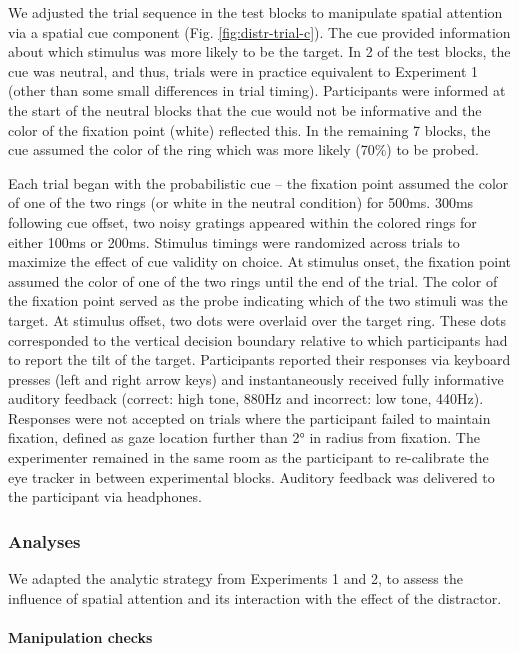 \documentclass[a4paper, nobind]{templates/ociamthesis}
\begin{document}
We adjusted the trial sequence in the test blocks to manipulate spatial attention via a spatial cue component (Fig. \ref{fig:distr-trial-c}). The cue provided information about which stimulus was more likely to be the target. In 2 of the test blocks, the cue was neutral, and thus, trials were in practice equivalent to Experiment 1 (other than some small differences in trial timing). Participants were informed at the start of the neutral blocks that the cue would not be informative and the color of the fixation point (white) reflected this. In the remaining 7 blocks, the cue assumed the color of the ring which was more likely (70\%) to be probed.

Each trial began with the probabilistic cue -- the fixation point assumed the color of one of the two rings (or white in the neutral condition) for 500ms. 300ms following cue offset, two noisy gratings appeared within the colored rings for either 100ms or 200ms. Stimulus timings were randomized across trials to maximize the effect of cue validity on choice. At stimulus onset, the fixation point assumed the color of one of the two rings until the end of the trial. The color of the fixation point served as the probe indicating which of the two stimuli was the target. At stimulus offset, two dots were overlaid over the target ring. These dots corresponded to the vertical decision boundary relative to which participants had to report the tilt of the target. Participants reported their responses via keyboard presses (left and right arrow keys) and instantaneously received fully informative auditory feedback (correct: high tone, 880Hz and incorrect: low tone, 440Hz). Responses were not accepted on trials where the participant failed to maintain fixation, defined as gaze location further than 2° in radius from fixation. The experimenter remained in the same room as the participant to re-calibrate the eye tracker in between experimental blocks. Auditory feedback was delivered to the participant via headphones.

\hypertarget{analyses-3}{%
\subsubsection{Analyses}\label{analyses-3}}

We adapted the analytic strategy from Experiments 1 and 2, to assess the influence of spatial attention and its interaction with the effect of the distractor.

\hypertarget{manipulation-checks}{%
\paragraph{Manipulation checks}\label{manipulation-checks}}
\end{document}
